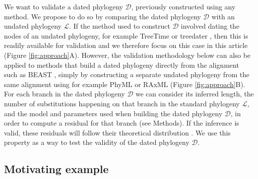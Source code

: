 \documentclass{article}
\begin{document}
We want to validate a dated phylogeny $\mathcal{D}$, previously constructed using
any method. We propose to do so by comparing the dated phylogeny $\mathcal{D}$ with 
an undated phylogeny $\mathcal{L}$. 
If the method used to construct $\mathcal{D}$ involved dating the nodes of an undated
phylogeny, for example TreeTime \citep{Sagulenko2018} or treedater \citep{Volz2017}, 
then this is readily available for validation and we therefore focus on this case in this article
(Figure \ref{fig:approach}A). However, the validation methodology
below can also be applied to methods that build a dated phylogeny directly from the alignment
such as BEAST \citep{Suchard2018},
simply by constructing a separate undated phylogeny from the same alignment using
for example PhyML \citep{Guindon2010} or RAxML \citep{Stamatakis2015} 
(Figure \ref{fig:approach}B). For each branch in the dated phylogeny $\mathcal{D}$ we can
consider its inferred length, the number of substitutions happening on that branch in the standard phylogeny
$\mathcal{L}$, and the model and parameters used when building the dated phylogeny $\mathcal{D}$,
in order to compute a residual for that branch (see Methods). If the inference is valid,
these residuals will follow their theoretical distribution
\citep{coxGeneralDefinitionResiduals1968,dunnRandomizedQuantileResiduals1996}. 
We use this property as a way to test the validity of the dated phylogeny $\mathcal{D}$.

\subsection*{Motivating example}
\end{document}
